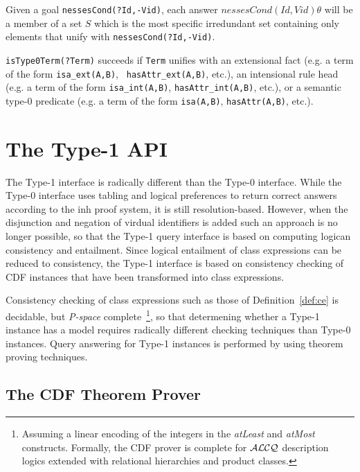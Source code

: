 \begin{description}
Given a goal {\tt nessesCond(?Id,-Vid)}, each answer
$nessesCond(Id,Vid)\theta$ will be a member of a set $S$ which is the
most specific irredundant set containing only elements that unify with
{\tt nessesCond(?Id,-Vid)}.  

{\tt isType0Term(?Term)} succeeds if {\tt Term} unifies with an
extensional fact (e.g. a term of the form {\tt isa\_ext(A,B)}, {\tt
hasAttr\_ext(A,B)}, etc.), an intensional rule head (e.g. a term of
the form {\tt isa\_int(A,B)}, {\tt hasAttr\_int(A,B)}, etc.), or a
semantic type-0 predicate (e.g. a term of the form {\tt isa(A,B)},
{\tt hasAttr(A,B)}, etc.).

\end{description}


\section{The Type-1 API} \label{sec:type1query}

The Type-1 interface is radically different than the Type-0 interface.
While the Type-0 interface uses tabling and logical preferences to
return correct answers according to the {\sc inh} proof system, it is
still resolution-based.  However, when the disjunction and negation of
virdual identifiers is added such an approach is no longer possible,
so that the Type-1 query interface is based on computing logican
consistency and entailment.  Since logical entailment of class
expressions can be reduced to consistency, the Type-1 interface is
based on consistency checking of CDF instances that have been
transformed into class expressions.

Consistency checking of class expressions such as those of
Definition~\ref{def:ce} is decidable, but {\em P-space}
complete~\footnote{Assuming a linear encoding of the integers in the
{\em atLeast} and {\em atMost} constructs.  Formally, the CDF prover
is complete for ${\cal ALCQ}$ description logics extended with
relational hierarchies and product classes.}, so that determening
whether a Type-1 instance has a model requires radically different
checking techniques than Type-0 instances.  Query answering for Type-1
instances is performed by using theorem proving techniques.

\subsection{The CDF Theorem Prover}

